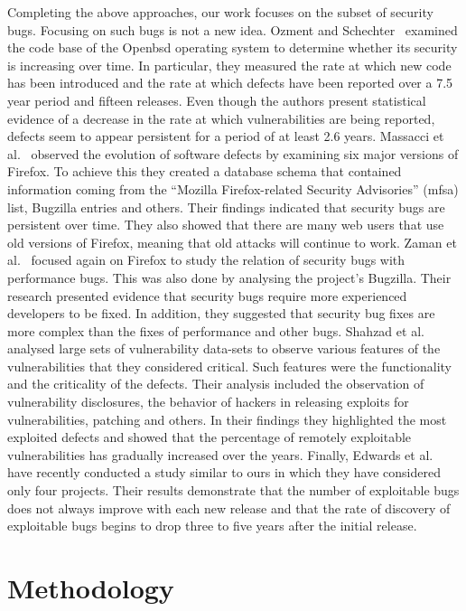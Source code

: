 \documentclass[letterpaper,twocolumn,10pt]{article}
\begin{document}
Completing the above approaches, our work focuses on the subset of security bugs.
Focusing on such bugs is not a new idea.
Ozment and Schechter~\cite{OS06} examined the code base of the Open{\sc bsd}
operating system to determine whether its security is increasing
over time. In particular, they measured the rate at which new code
has been introduced and the rate at which defects have been reported over
a 7.5 year period and fifteen releases.
Even though the authors present statistical evidence
of a decrease in the rate at which vulnerabilities are being reported,
defects seem to appear persistent for a period of at least 2.6 years.
Massacci et al.~\cite{MNN11} observed
the evolution of software defects by examining six major versions of Firefox.
To achieve this they created a database schema that contained information
coming from the ``Mozilla Firefox-related Security Advisories'' ({\sc mfsa})
list,
Bugzilla entries and others. Their findings indicated that security bugs are
persistent over time. They also showed that there are many web users that use
old versions of Firefox, meaning that old attacks will continue to work.
Zaman et al.~\cite{ZAH11} focused again on Firefox to study the relation of
security bugs with performance bugs. This was also done by analysing the project's
Bugzilla. Their research presented evidence that security bugs require more experienced developers
to be fixed. In addition, they suggested that security bug fixes are more complex than the
fixes of performance and other bugs.
Shahzad et al.~\cite{SSL12} analysed large sets of vulnerability data-sets to observe
various features of the vulnerabilities that they considered critical. Such features
were the functionality and the criticality of the defects. Their analysis
included the observation of vulnerability disclosures, the behavior of
hackers in releasing exploits for vulnerabilities, patching and others. In
their findings they highlighted the most exploited defects and showed that
the percentage of remotely exploitable vulnerabilities has gradually increased
over the years. Finally, Edwards et al.~\cite{EC12} have recently conducted
a study similar  to ours in which they have considered only four projects.
Their results demonstrate that the number of exploitable bugs does not
always improve with each new release and that the rate of discovery of
exploitable bugs begins to drop three to five years after the
initial release.

\section{Methodology}
\label{sec:meth}
\end{document}
